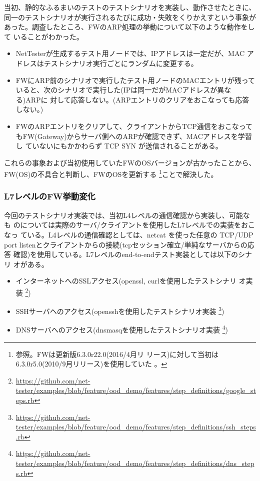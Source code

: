 当初、静的なふるまいのテストのテストシナリオを実装し、動作させたときに、
同一のテストシナリオが実行されるたびに成功・失敗をくりかえすという事象が
あった。調査したところ、FWのARP処理の挙動について以下のような動作をして
いることがわかった。
\begin{itemize}
 \item NetTesterが生成するテスト用ノードでは、IPアドレスは一定だが、MAC
       アドレスはテストシナリオ実行ごとにランダムに変更する。
 \item FWにARP前のシナリオで実行したテスト用ノードのMACエントリが残って
       いると、次のシナリオで実行した(IPは同一だがMACアドレスが異なる)ARPに
       対して応答しない。(ARPエントリのクリアをおこなっても応答しない。)
 \item FWのARPエントリをクリアして、クライアントからTCP通信をおこなって
       もFW(Gateway)からサーバ側へのARPが確認できず、MACアドレスを学習し
       ていないにもかかわらず TCP SYN が送信されることがある。
\end{itemize}

これらの事象および当初使用していたFWのOSバージョンが古かったことから、
FW(OS)の不具合と判断し、FWのOSを更新する
\footnote{参照。FWは更新版6.3.0r22.0(2016/4月リ
リース)に対して当初は6.3.0r5.0(2010/9月リリース)を使用していた
\cite{screenos-releases}。}ことで解決した。

   \subsubsection{L7レベルのFW挙動変化}
今回のテストシナリオ実装では、当初L4レベルの通信確認から実装し、可能なも
のについては実際のサーバ/クライアントを使用したL7レベルでの実装をおこなっ
ている。L4レベルの通信確認としては、netcat を使った任意の TCP/UDP port
listenとクライアントからの接続(tcpセッション確立/単純なサーバからの応答
確認)を使用している。L7レベルのend-to-endテスト実装としては以下のシナリ
オがある。
\begin{itemize}
 \item インターネットへのSSLアクセス(openssl, curlを使用したテストシナリ
       オ実装
       \footnote{\url{https://github.com/net-tester/examples/blob/feature/ood_demo/features/step_definitions/google_steps.rb}})
 \item SSHサーバヘのアクセス(opensshを使用したテストシナリオ実装
       \footnote{\url{https://github.com/net-tester/examples/blob/feature/ood_demo/features/step_definitions/ssh_steps.rb}})
 \item DNSサーバへのアクセス(dnsmasqを使用したテストシナリオ実装
       \footnote{\url{https://github.com/net-tester/examples/blob/feature/ood_demo/features/step_definitions/dns_steps.rb}})
\end{itemize}

